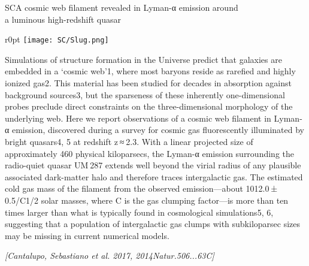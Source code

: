 \begin{section}{SC}{A cosmic web filament revealed in Lyman-α emission around \\
    \qquad a luminous high-redshift quasar}
  \begin{minipage}{\linewidth}
    \begin{wrapfigure}{r}{0pt}
      \texttt{[image: SC/Slug.png]}
    \end{wrapfigure}
    \strut {\small Simulations of structure formation in the Universe
      predict that galaxies are embedded in a ‘cosmic web’1, where most
      baryons reside as rarefied and highly ionized gas2. This material has
      been studied for decades in absorption against background sources3,
      but the sparseness of these inherently one-dimensional probes preclude
      direct constraints on the three-dimensional morphology of the
      underlying web. Here we report observations of a cosmic web filament
      in Lyman-α emission, discovered during a survey for cosmic gas
      fluorescently illuminated by bright quasars4, 5 at redshift z ≈ 2.3.
      With a linear projected size of approximately 460 physical
      kiloparsecs, the Lyman-α emission surrounding the radio-quiet quasar
      UM 287 extends well beyond the virial radius of any plausible
      associated dark-matter halo and therefore traces intergalactic gas.
      The estimated cold gas mass of the filament from the observed
      emission—about 1012.0 ± 0.5/C1/2 solar masses, where C is the gas
      clumping factor—is more than ten times larger than what is typically
      found in cosmological simulations5, 6, suggesting that a population of
      intergalactic gas clumps with subkiloparsec sizes may be missing in
      current numerical models.}
  \end{minipage}

  \vspace{0.7cm}

  {\footnotesize \textit{[Cantalupo, Sebastiano et al. 2017, 2014Natur.506...63C]}}
\end{section}